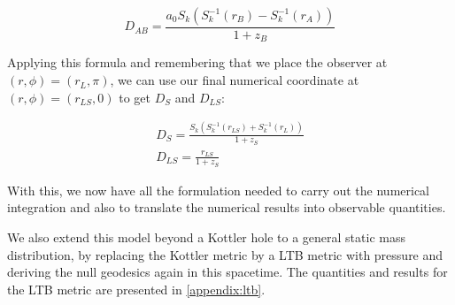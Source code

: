 \begin{equation}
  D_{AB} = \frac{a_0  S_k(S_k^{-1}(r_B) - S_k^{-1}(r_A))}{1+z_B}
\end{equation}

Applying this formula and remembering that we place the observer at $(r, \phi) = (r_L, \pi)$, we can use our final numerical coordinate at $(r, \phi) = (r_{LS}, 0)$ to get $D_S$ and $D_{LS}$:

\begin{subequations}
  \begin{gather}
    D_{S} = \frac{S_k(S_k^{-1}(r_{LS}) + S_k^{-1}(r_L))}{1+z_S}\\
    D_{LS} = \frac{r_{LS}}{1+z_S}
  \end{gather}
\end{subequations}

With this, we now have all the formulation needed to carry out the numerical integration and also to translate the numerical results into observable quantities. 

We also extend this model beyond a Kottler hole to a general static mass distribution, by replacing the Kottler metric by a LTB metric with pressure and deriving the null geodesics again in this spacetime. The quantities and results for the LTB metric are presented in \autoref{appendix:ltb}.